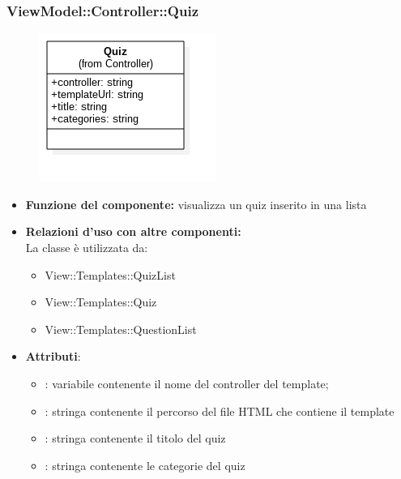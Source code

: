 \subsubsection{ViewModel::Controller::Quiz}
\begin{figure}[h!]
\begin{center}
	\includegraphics[scale=0.4]{../images/ViewModel/Controller/Quiz.png}
\end{center}
\end{figure}
\begin{itemize}
\item\textbf{Funzione del componente:} visualizza un quiz inserito in una lista
				\item\textbf{Relazioni d'uso con altre componenti:}\\
 La classe è utilizzata da:
 	\begin{itemize}
 		\item View::Templates::QuizList
 		\item View::Templates::Quiz
 		\item View::Templates::QuestionList
 	\end{itemize}
 \item\textbf{Attributi}:
 	\begin{itemize}
 		\item{}: variabile contenente il nome del controller del template;\\
		
		\item{}: stringa contenente il percorso del file HTML che contiene il template\\
		\item{}: stringa contenente il titolo del quiz
		\item{}: stringa contenente le categorie del quiz
 	\end{itemize}
 \end{itemize}
\newpage

